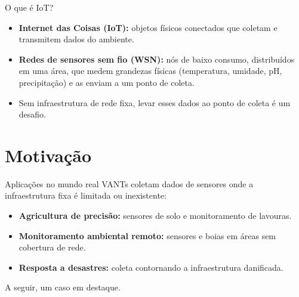 \documentclass[aspectratio=169,11pt]{beamer}
\newcommand{\sensorsym}[1]{%
  \fill[blue!20] (#1-0.08,0) rectangle (#1+0.08,0.3);
  \draw[line width=0.4pt] (#1-0.08,0) rectangle (#1+0.08,0.3);
  \draw[line width=0.4pt] (#1,0.3)--(#1,0.46);
  \fill (#1,0.46) circle (0.03);
}
\begin{document}
\begin{frame}{O que é IoT?}
  \begin{itemize}
    \item \textbf{Internet das Coisas (IoT):} objetos físicos conectados que coletam e transmitem dados do ambiente.
    \item \textbf{Redes de sensores sem fio (WSN):} nós de baixo consumo, distribuídos em uma área, que medem grandezas físicas (temperatura, umidade, pH, precipitação) e as enviam a um ponto de coleta.
    \item Sem infraestrutura de rede fixa, levar esses dados ao ponto de coleta é um desafio.
  \end{itemize}
  \vspace{0.5em}
  \centering
\end{frame}

\section{Motivação}

\begin{frame}{Aplicações no mundo real}
  VANTs coletam dados de sensores onde a infraestrutura fixa é limitada ou inexistente:
  \begin{itemize}
    \item \textbf{Agricultura de precisão:} sensores de solo e monitoramento de lavouras.
    \item \textbf{Monitoramento ambiental remoto:} sensores e boias em áreas sem cobertura de rede.
    \item \textbf{Resposta a desastres:} coleta contornando a infraestrutura danificada.
  \end{itemize}
  \vspace{0.4em}
  A seguir, um caso em destaque.
\end{frame}
\end{document}
